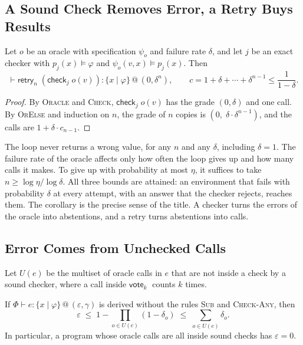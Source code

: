 \documentclass[acmsmall,nonacm,screen]{acmart}
\makeatletter
\newcommand{\kw}[1]{\mathsf{#1}}
\newcommand{\chk}[2]{\kw{check}_{#1}\;#2}
\newcommand{\vote}[2]{\kw{vote}_{#1}\;#2}
\newcommand{\retry}[2]{\kw{retry}_{#1}\;#2}
\newcommand{\rty}[2]{\{#1 \mid #2\}}
\newcommand{\at}[2]{\mathrel{@}(#1, #2)}
\makeatother
\begin{document}
\subsection{A Sound Check Removes Error, a Retry Buys Results}

\begin{corollary}
\label{cor:loop}
Let $o$ be an oracle with specification $\psi_o$ and failure rate $\delta$, and let $j$ be an
exact checker with $p_j(x) \models \varphi$ and $\psi_o(v, x) \models p_j(x)$. Then
\[
\vdash \retry{n}{(\chk{j}{o(v)})} : \rty{x}{\varphi} \at{0}{\delta^n},
\qquad c = 1 + \delta + \cdots + \delta^{n-1} \le \frac{1}{1 - \delta} .
\]
\end{corollary}

\begin{proof}
By \textsc{Oracle} and \textsc{Check}, $\chk{j}{o(v)}$ has the grade $(0, \delta)$ and one
call. By \textsc{OrElse} and induction on $n$, the grade of $n$ copies is
$(0,\; \delta \cdot \delta^{n-1})$, and the calls are $1 + \delta \cdot c_{n-1}$.
\end{proof}

The loop never returns a wrong value, for any $n$ and any $\delta$, including $\delta = 1$.
The failure rate of the oracle affects only how often the loop gives up and how many calls it
makes. To give up with probability at most $\eta$, it suffices to take
$n \ge \log \eta / \log \delta$. All three bounds are attained: an environment that fails
with probability $\delta$ at every attempt, with an answer that the checker rejects, reaches
them. The corollary is the precise sense of the title. A checker turns the errors of the
oracle into abstentions, and a retry turns abstentions into calls.

\subsection{Error Comes from Unchecked Calls}

Let $U(e)$ be the multiset of oracle calls in $e$ that are not inside a check by a sound
checker, where a call inside $\vote{k}{}$ counts $k$ times.

\begin{proposition}
\label{prop:unchecked}
If $\Phi \vdash e : \rty{x}{\varphi} \at{\varepsilon}{\gamma}$ is derived without the rules
\textsc{Sub} and \textsc{Check-Any}, then
\[
\varepsilon \;\le\; 1 - \prod_{o \in U(e)} (1 - \delta_o) \;\le\; \sum_{o \in U(e)} \delta_o .
\]
In particular, a program whose oracle calls are all inside sound checks has $\varepsilon = 0$.
\end{proposition}
\end{document}
